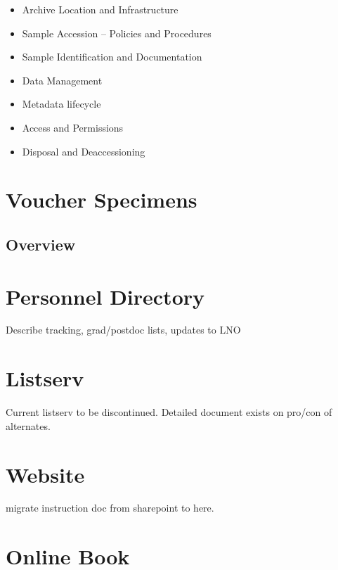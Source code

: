 \documentclass[
  letterpaper,
  DIV=11,
  numbers=noendperiod]{scrreprt}
\providecommand{\tightlist}{%
  \setlength{\itemsep}{0pt}\setlength{\parskip}{0pt}}\usepackage{longtable,booktabs,array}
\begin{document}
\begin{itemize}
\tightlist
\item
  Archive Location and Infrastructure
\item
  Sample Accession -- Policies and Procedures
\item
  Sample Identification and Documentation
\item
  Data Management
\item
  Metadata lifecycle
\item
  Access and Permissions
\item
  Disposal and Deaccessioning
\end{itemize}


\chapter{Voucher Specimens}\label{voucher-specimens}

\section{Overview}\label{overview-5}


\chapter{Personnel Directory}\label{personnel-directory}

Describe tracking, grad/postdoc lists, updates to LNO


\chapter{Listserv}\label{listserv}

Current listserv to be discontinued. Detailed document exists on pro/con
of alternates.


\chapter{Website}\label{website-1}

migrate instruction doc from sharepoint to here.


\chapter{Online Book}\label{online-book}
\end{document}
